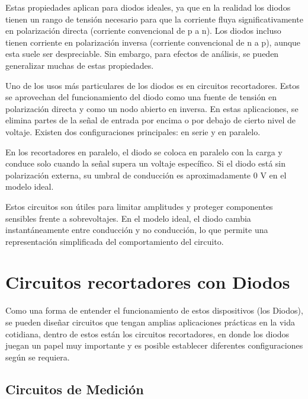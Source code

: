 \documentclass[journal]{IEEEtran}
\begin{document}
Estas propiedades aplican para diodos ideales, ya que en la realidad los diodos tienen un rango de tensión necesario para que la
corriente fluya significativamente en polarización directa (corriente convencional de p a n). Los diodos incluso tienen corriente en polarización inversa (corriente convencional de n a p), aunque esta suele ser despreciable. Sin embargo, para efectos de análisis, se pueden 
generalizar muchas de estas propiedades.

Uno de los usos más particulares de los diodos es en circuitos recortadores. Estos se aprovechan del funcionamiento del diodo como una fuente de tensión en polarización directa
y como un nodo abierto en inversa. En estas aplicaciones, se elimina partes de la señal de entrada por encima o por debajo de cierto nivel de voltaje. Existen dos configuraciones principales: en serie y en paralelo.  

En los recortadores en paralelo, el diodo se coloca en paralelo con la carga y conduce solo cuando la señal supera un voltaje específico. Si el diodo está sin polarización externa, su umbral de conducción es aproximadamente 0 V en el modelo ideal.   

Estos circuitos son útiles para limitar amplitudes y proteger componentes sensibles frente a sobrevoltajes. En el modelo ideal, el diodo cambia instantáneamente entre conducción y no conducción, lo que permite una representación simplificada del comportamiento del circuito. \cite{Boylestad}


\section{Circuitos recortadores con Diodos}
Como una forma de entender el funcionamiento de estos dispositivos (los Diodos), se pueden diseñar circuitos que tengan amplias aplicaciones prácticas en la vida cotidiana,
dentro de estos están los circuitos recortadores, en donde los diodos juegan un papel muy importante y es posible establecer diferentes configuraciones según se requiera. 


\subsection{Circuitos de Medición}
\end{document}
